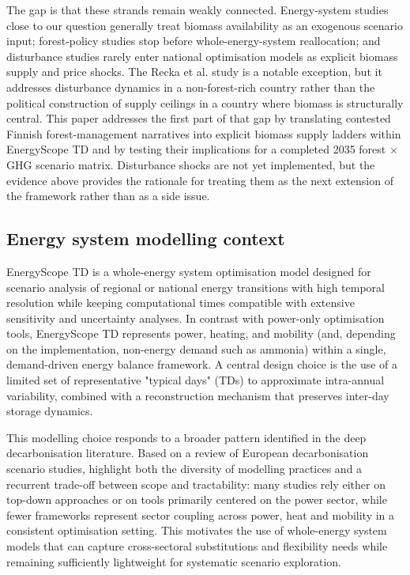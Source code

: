 \documentclass{article}
\begin{document}
The gap is that these strands remain weakly connected. Energy-system studies close to our question generally treat biomass availability as an exogenous scenario input; forest-policy studies stop before whole-energy-system reallocation; and disturbance studies rarely enter national optimisation models as explicit biomass supply and price shocks. The Recka et al. study is a notable exception, but it addresses disturbance dynamics in a non-forest-rich country rather than the political construction of supply ceilings in a country where biomass is structurally central. This paper addresses the first part of that gap by translating contested Finnish forest-management narratives into explicit biomass supply ladders within EnergyScope TD and by testing their implications for a completed 2035 forest \(\times\) GHG scenario matrix. Disturbance shocks are not yet implemented, but the evidence above provides the rationale for treating them as the next extension of the framework rather than as a side issue.


\subsection{Energy system modelling context}
EnergyScope TD is a whole-energy system optimisation model designed for scenario analysis of regional or national energy transitions with high temporal resolution while keeping computational times compatible with extensive sensitivity and uncertainty analyses. In contrast with power-only optimisation tools, EnergyScope TD represents power, heating, and mobility (and, depending on the implementation, non-energy demand such as ammonia) within a single, demand-driven energy balance framework. A central design choice is the use of a limited set of representative "typical days" (TDs) to approximate intra-annual variability, combined with a reconstruction mechanism that preserves inter-day storage dynamics.

This modelling choice responds to a broader pattern identified in the deep decarbonisation literature. Based on a review of European decarbonisation scenario studies, \citet{borasioDeepDecarbonisationRegional2022} highlight both the diversity of modelling practices and a recurrent trade-off between scope and tractability: many studies rely either on top-down approaches or on tools primarily centered on the power sector, while fewer frameworks represent sector coupling across power, heat and mobility in a consistent optimisation setting. This motivates the use of whole-energy system models that can capture cross-sectoral substitutions and flexibility needs while remaining sufficiently lightweight for systematic scenario exploration.
\end{document}
